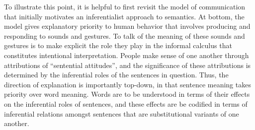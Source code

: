 To illustrate this point, it is helpful to first revisit the model of communication that initially motivates an inferentialist approach to semantics. At bottom, the model gives explanatory priority to human behavior that involves producing and responding to sounds and gestures. To talk of the meaning of these sounds and gestures is to make explicit the role they play in the informal calculus that constitutes intentional interpretation. People make sense of one another through attributions of ``sentential attitudes'', and the significance of these attributions is determined by the inferential roles of the sentences in question. Thus, the direction of explanation is importantly top-down, in that sentence meaning takes priority over word meaning. Words are to be understood in terms of their effects on the inferential roles of sentences, and these effects are be codified in terms of inferential relations amongst sentences that are substitutional variants of one another.

